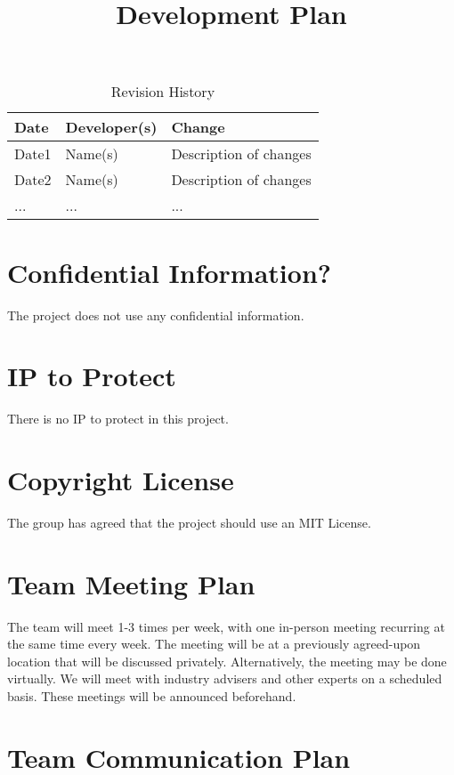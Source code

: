 \documentclass{article}
\title{Development Plan\\\progname}
\author{\authname}
\date{}
\begin{document}
\maketitle

\begin{table}[hp]
\caption{Revision History} \label{TblRevisionHistory}
\begin{tabularx}{\textwidth}{llX}
\toprule
\textbf{Date} & \textbf{Developer(s)} & \textbf{Change}\\
\midrule
Date1 & Name(s) & Description of changes\\
Date2 & Name(s) & Description of changes\\
... & ... & ...\\
\bottomrule
\end{tabularx}
\end{table}

\newpage{}

\section{Confidential Information?}

The project does not use any confidential information. 

\section{IP to Protect}

There is no IP to protect in this project. 


\section{Copyright License}

The group has agreed that the project should use an MIT License.


\section{Team Meeting Plan}


The team will meet 1-3 times per week, with one in-person meeting recurring at 
the same time every week. The meeting will be at a previously agreed-upon 
location that will be discussed privately. Alternatively, the meeting may be 
done virtually. We will meet with industry advisers and  other experts on a 
scheduled basis. These meetings will be announced beforehand. 

\section{Team Communication Plan}
\end{document}
